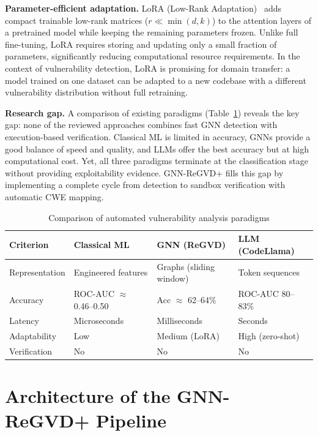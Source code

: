 \documentclass[runningheads]{llncs}
\begin{document}
\textbf{Parameter-efficient adaptation.}
LoRA (Low-Rank Adaptation)~\cite{hu2021lora} adds compact trainable low-rank matrices ($r \ll \min(d, k)$) to the attention layers of a pretrained model while keeping the remaining parameters frozen. Unlike full fine-tuning, LoRA requires storing and updating only a small fraction of parameters, significantly reducing computational resource requirements. In the context of vulnerability detection, LoRA is promising for domain transfer: a model trained on one dataset can be adapted to a new codebase with a different vulnerability distribution without full retraining.

\textbf{Research gap.}
A comparison of existing paradigms (Table~\ref{tab:paradigms}) reveals the key gap: none of the reviewed approaches combines fast GNN detection with execution-based verification. Classical ML is limited in accuracy, GNNs provide a good balance of speed and quality, and LLMs offer the best accuracy but at high computational cost. Yet, all three paradigms terminate at the classification stage without providing exploitability evidence. GNN-ReGVD+ fills this gap by implementing a complete cycle from detection to sandbox verification with automatic CWE mapping.

\begin{table}
\centering
\caption{Comparison of automated vulnerability analysis paradigms}
\label{tab:paradigms}
\small
\begin{tabular}{|p{2.0cm}|p{2.6cm}|p{2.8cm}|p{3.0cm}|}
\hline
\textbf{Criterion} & \textbf{Classical ML} & \textbf{GNN (ReGVD)} & \textbf{LLM (CodeLlama)} \\
\hline
Representation & Engineered features & Graphs (sliding window) & Token sequences \\
Accuracy & ROC-AUC $\approx$ 0.46--0.50 & Acc $\approx$ 62--64\% & ROC-AUC 80--83\% \\
Latency & Microseconds & Milliseconds & Seconds \\
Adaptability & Low & Medium (LoRA) & High (zero-shot) \\
Verification & No & No & No \\
\hline
\end{tabular}
\end{table}


\section{Architecture of the GNN-ReGVD+ Pipeline}
\end{document}
